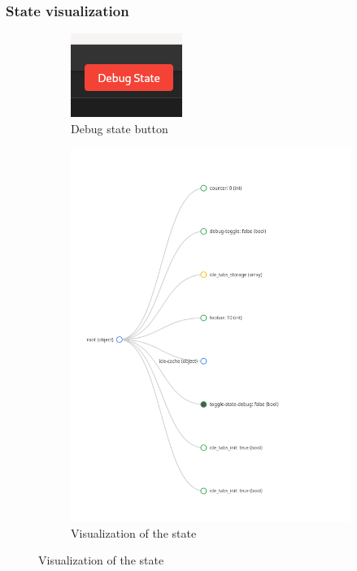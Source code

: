 \begin{frame}
  \frametitle{State visualization}
  \begin{figure}[H]
    \begin{subfigure}[h]{0.45\textwidth}
    \centering
    \includegraphics[height=0.25\textwidth]{./pics/debug-state-btn.png}
    \caption{
      Debug state button
    }
    \end{subfigure}
    \hfill
    \begin{subfigure}[h]{0.45\textwidth}
    \centering
    \includegraphics[height=1\textwidth]{./pics/debug-state.png}
    \caption{
      Visualization of the state
    }
    \end{subfigure}
  \end{figure}
\end{frame}

